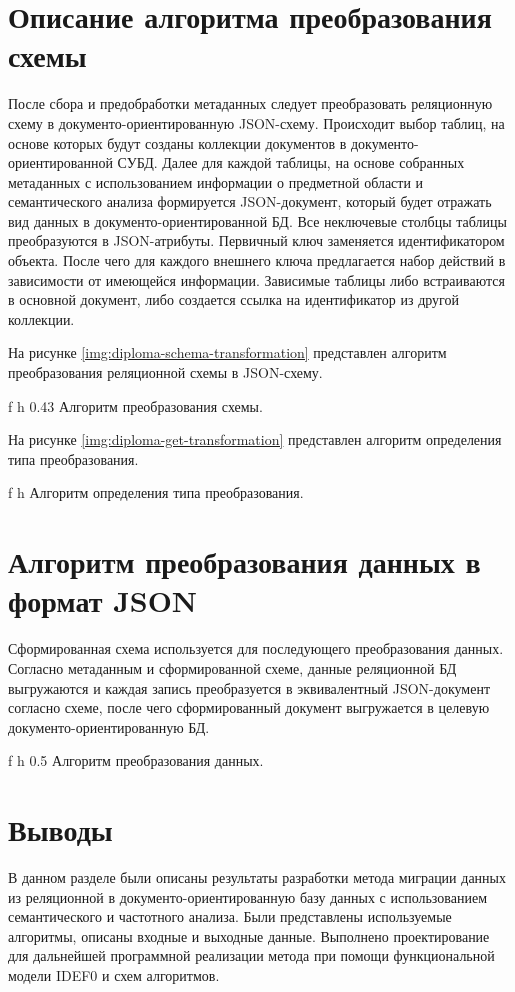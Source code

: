 \section{Описание алгоритма преобразования схемы}
После сбора и предобработки метаданных следует преобразовать реляционную схему в документо-ориентированную JSON-схему.
Происходит выбор таблиц, на основе которых будут созданы коллекции документов в документо-ориентированной СУБД.
Далее для каждой таблицы, на основе собранных метаданных с использованием информации о предметной области и семантического анализа формируется JSON-документ,
который будет отражать вид данных в документо-ориентированной БД.
Все неключевые столбцы таблицы преобразуются в JSON-атрибуты. 
Первичный ключ заменяется идентификатором объекта.
После чего для каждого внешнего ключа предлагается набор действий в зависимости от имеющейся информации.
Зависимые таблицы либо встраиваются в основной документ, либо создается ссылка на идентификатор из другой коллекции.

\clearpage

На рисунке \ref{img:diploma-schema-transformation} представлен алгоритм преобразования реляционной схемы в JSON-схему.

    {f}
    {h}
    {0.43\textwidth}
{Алгоритм преобразования схемы.}

\clearpage

На рисунке \ref{img:diploma-get-transformation} представлен алгоритм определения типа преобразования.

    {f}
    {h}
    {\textwidth}
{Алгоритм определения типа преобразования.}



\clearpage

\section{Алгоритм преобразования данных в формат JSON}
Сформированная схема используется для последующего преобразования данных.
Согласно метаданным и сформированной схеме, 
данные реляционной БД выгружаются и каждая запись преобразуется в эквивалентный JSON-документ согласно схеме,
после чего сформированный документ выгружается в целевую документо-ориентированную БД.

    {f}
    {h}
    {0.5\textwidth}
{Алгоритм преобразования данных.}

\clearpage

\section*{Выводы}
В данном разделе были описаны результаты разработки
метода миграции данных из реляционной в документо-ориентированную базу данных
с использованием семантического и частотного анализа.
Были представлены используемые алгоритмы, описаны входные и выходные данные.
Выполнено проектирование для дальнейшей программной реализации метода при помощи 
функциональной модели IDEF0 и схем алгоритмов.

